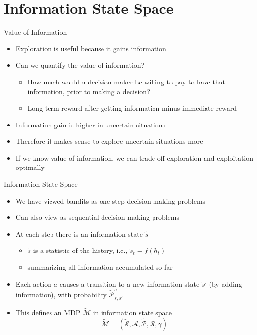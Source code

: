 \section{Information State Space}
\begin{frame}{Value of Information}
\begin{itemize}
    \item Exploration is useful because it gains information
    \item Can we quantify the value of information?
    \begin{itemize}
        \item How much would a decision-maker be willing to pay to have that
              information, prior to making a decision?
        \item Long-term reward after getting information minus immediate reward
    \end{itemize}
    \item Information gain is higher in uncertain situations
    \item Therefore it makes sense to explore uncertain situations more
    \item If we know value of information, we can trade-off exploration and
          exploitation optimally
\end{itemize}
\end{frame}

\begin{frame}{Information State Space}
\begin{itemize}
    \item We have viewed bandits as one-step decision-making problems
    \item Can also view as sequential decision-making problems
    \item At each step there is an information state $\tilde{s}$
    \begin{itemize}
        \item $\tilde{s}$ is a statistic of the history, i.e., $\tilde{s}_t = f(h_t)$
        \item summarizing all information accumulated so far
    \end{itemize}
    \item Each action $a$ causes a transition to a new information state $\tilde{s}'$ (by
          adding information), with probability $\tilde{\mathcal{P}}^a_{\tilde{s}, \tilde{s}'}$
    \item This defines an MDP $\tilde{\mathcal{M}}$ in information state space
    \[
        \tilde{\mathcal{M}} = (\tilde{\mathcal{S}}, \mathcal{A}, \tilde{\mathcal{P}}, \mathcal{R}, \gamma)
    \]
\end{itemize}
\end{frame}

